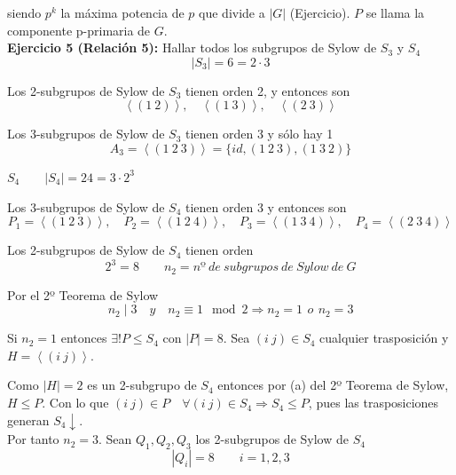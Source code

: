 \documentclass{article}
\begin{document}
siendo $p^k$ la máxima potencia de $p$ que divide a $|G|$ (Ejercicio). $P$ se llama la componente p-primaria de $G$. \\

\textbf{Ejercicio 5 (Relación 5):} Hallar todos los subgrupos de Sylow de $S_3$ y $S_4$
\begin{equation*}
|S_3|=6=2\cdot 3
\end{equation*}

Los 2-subgrupos de Sylow de $S_3$ tienen orden 2, y entonces son
\begin{equation*}
\left\langle (1\:2)\right\rangle,\quad\left\langle(1\:3)\right\rangle,\quad\left\langle(2\:3)\right\rangle
\end{equation*}

Los 3-subgrupos de Sylow de $S_3$ tienen orden 3 y sólo hay 1
\begin{equation*}
A_3=\left\langle(1\:2\:3)\right\rangle=\{id,(1\:2\:3),(1\:3\:2)\}
\end{equation*}

$S_4\qquad |S_4|=24=3\cdot 2^3$

Los 3-subgrupos de Sylow de $S_4$ tienen orden 3 y entonces son 
\begin{equation*}
P_1=\left\langle(1\:2\:3)\right\rangle,\quad P_2=\left\langle(1\:2\:4)\right\rangle,\quad P_3=\left\langle(1\:3\:4)\right\rangle,\quad P_4=\left\langle(2\:3\:4)\right\rangle
\end{equation*}

Los 2-subgrupos de Sylow de $S_4$ tienen orden
\begin{equation*}
2^3=8\qquad n_2=nº\:de\:subgrupos\:de\:Sylow\:de\:G
\end{equation*}

Por el 2º Teorema de Sylow
\begin{equation*}
n_2\mid 3 \quad y\quad n_2\equiv 1\mod{2}\Rightarrow n_2=1\:\,o\:\,n_2=3
\end{equation*}

Si $n_2=1$ entonces $\exists!P\leq S_4$ con $|P|=8$. Sea $(i\:j)\in S_4$ cualquier trasposición y $H=\left\langle(i\:j)\right\rangle$.

Como $|H|=2$ es un 2-subgrupo de $S_4$ entonces por (a) del 2º Teorema de Sylow, $H\leq P$. Con lo que $(i\:j)\in P\quad \forall (i\:j)\in S_4\Rightarrow S_4\leq P$, pues las trasposiciones generan $S_4\downarrow$. \\

Por tanto $n_2=3$. Sean $Q_1,Q_2,Q_3$ los 2-subgrupos de Sylow de $S_4$
\begin{equation*}
|Q_i|=8\qquad i=1,2,3
\end{equation*}
\end{document}
